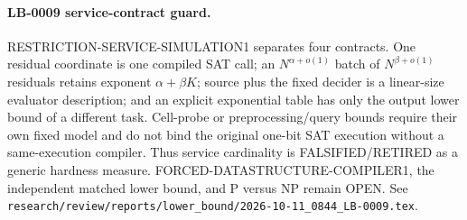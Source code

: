 \paragraph{LB-0009 service-contract guard.}
RESTRICTION-SERVICE-SIMULATION1 separates four contracts.  One residual
coordinate is one compiled SAT call; an $N^{\alpha+o(1)}$ batch of
$N^{\beta+o(1)}$ residuals retains exponent $\alpha+\beta K$; source plus
the fixed decider is a linear-size evaluator description; and an explicit
exponential table has only the output lower bound of a different task.
Cell-probe or preprocessing/query bounds require their own fixed model and do
not bind the original one-bit SAT execution without a same-execution compiler.
Thus service cardinality is FALSIFIED/RETIRED as a generic hardness measure.
FORCED-DATASTRUCTURE-COMPILER1, the independent matched lower bound, and P
versus NP remain OPEN.  See
\texttt{research/review/reports/lower\_bound/2026-10-11\_0844\_LB-0009.tex}.

